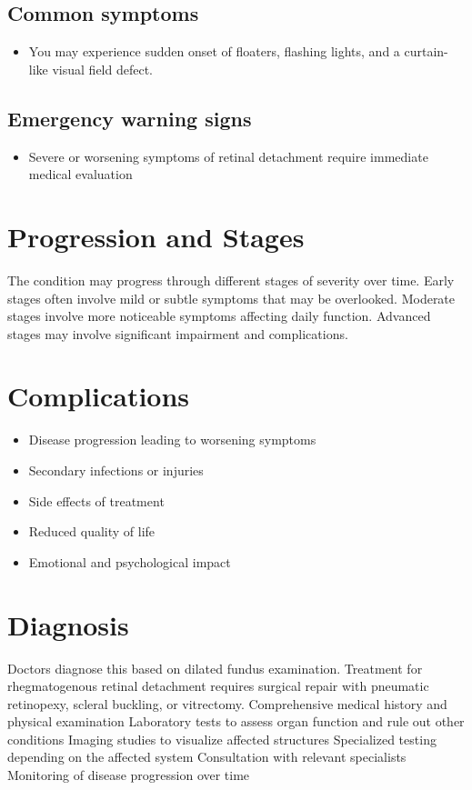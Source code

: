 \subsection{Common symptoms}
\begin{itemize}[noitemsep]
  \item You may experience sudden onset of floaters, flashing lights, and a curtain-like visual field defect. 
  \end{itemize}

\subsection{Emergency warning signs}
\begin{itemize}[noitemsep]
  \item Severe or worsening symptoms of retinal detachment require immediate medical evaluation
\end{itemize}
\section{Progression and Stages}
The condition may progress through different stages of severity over time. Early stages often involve mild or subtle symptoms that may be overlooked. Moderate stages involve more noticeable symptoms affecting daily function. Advanced stages may involve significant impairment and complications.
\section{Complications}
\begin{itemize}[noitemsep]
  \item Disease progression leading to worsening symptoms
  \item Secondary infections or injuries
  \item Side effects of treatment
  \item Reduced quality of life
  \item Emotional and psychological impact
\end{itemize}
\section{Diagnosis}
Doctors diagnose this based on dilated fundus examination. Treatment for rhegmatogenous retinal detachment requires surgical repair with pneumatic retinopexy, scleral buckling, or vitrectomy. Comprehensive medical history and physical examination Laboratory tests to assess organ function and rule out other conditions Imaging studies to visualize affected structures Specialized testing depending on the affected system Consultation with relevant specialists Monitoring of disease progression over time

